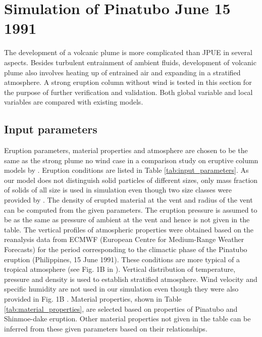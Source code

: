 \section{Simulation of Pinatubo June 15 1991}
The development of a volcanic plume is more complicated than JPUE in several aspects. Besides turbulent entrainment of ambient fluids, development of volcanic plume also involves heating up of entrained air and expanding in a stratified atmosphere. A strong eruption column without wind is tested in this section for the purpose of further verification and validation.
Both global variable and local variables are compared with existing models.

\subsection{Input parameters}
Eruption parameters, material properties and atmosphere are chosen to be the same as the strong plume no wind case in a comparison study on eruptive column models by \citet {costa2016results}. Eruption conditions are listed in Table \ref{tab:input_parameters}. As our model does not distinguish solid particles of different sizes, only mass fraction of solids of all size is used in simulation even though two size classes were provided by \citet {costa2016results}. The density of erupted material at the vent and radius of the vent can be computed from the given parameters. The eruption pressure is assumed to be as the same as pressure of ambient at the vent and hence is not given in the table. The vertical profiles of atmospheric properties were obtained based on the reanalysis data from ECMWF (European Centre for Medium-Range Weather Forecasts) for the period corresponding to the climactic phase of the Pinatubo eruption (Philippines, 15 June 1991). These conditions are more typical of a tropical atmosphere (see Fig. 1B in \citep{costa2016results}). 
Vertical distribution of temperature, pressure and density is used to establish stratified atmosphere. Wind velocity and specific humidity are not used in our simulation even though they were also provided in Fig. 1B \citep{costa2016results}. Material properties, shown in Table \ref{tab:material_properties}, are selected based on properties of Pinatubo and Shinmoe-dake eruption. Other material properties not given in the table can be inferred from these given parameters based on their relationships.

